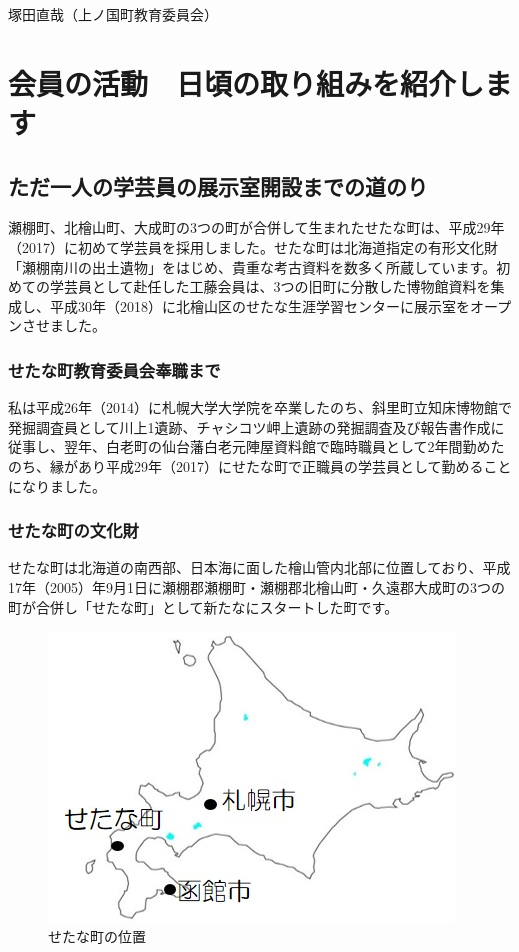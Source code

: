 \documentclass[a4j,11pt,twocolumn,openany]{jsbook}
\begin{document}
\begin{flushright}
	塚田直哉（上ノ国町教育委員会）
\end{flushright}

\chapter{会員の活動　日頃の取り組みを紹介します}

\section{ただ一人の学芸員の展示室開設までの道のり}
瀬棚町、北檜山町、大成町の3つの町が合併して生まれたせたな町は、平成29年（2017）に初めて学芸員を採用しました。せたな町は北海道指定の有形文化財「瀬棚南川の出土遺物」をはじめ、貴重な考古資料を数多く所蔵しています。初めての学芸員として赴任した工藤会員は、3つの旧町に分散した博物館資料を集成し、平成30年（2018）に北檜山区のせたな生涯学習センターに展示室をオープンさせました。

\subsection{せたな町教育委員会奉職まで}
私は平成26年（2014）に札幌大学大学院を卒業したのち、斜里町立知床博物館で発掘調査員として川上1遺跡、チャシコツ岬上遺跡の発掘調査及び報告書作成に従事し、翌年、白老町の仙台藩白老元陣屋資料館で臨時職員として2年間勤めたのち、縁があり平成29年（2017）にせたな町で正職員の学芸員として勤めることになりました。

\subsection{せたな町の文化財}

せたな町は北海道の南西部、日本海に面した檜山管内北部に位置しており、平成17年（2005）年9月1日に瀬棚郡瀬棚町・瀬棚郡北檜山町・久遠郡大成町の3つの町が合併し「せたな町」として新たなにスタートした町です。

\begin{figure}[H]
	\centering
	\includegraphics[width=0.8\linewidth]{fig/04_Kudo/fig01.jpg}
	\caption{せたな町の位置}
	\label{}
\end{figure}
\end{document}

